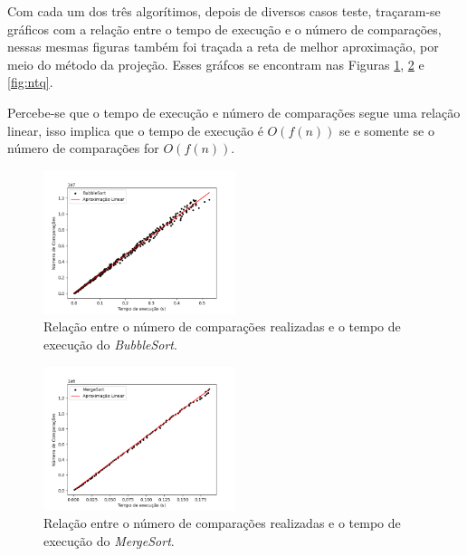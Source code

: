 \documentclass[12pt,a4paper,oneside]{article}
\begin{document}
\quad Com cada um dos três algorítimos, depois de diversos casos teste, traçaram-se gráficos com a relação entre o tempo de execução e o número de comparações, nessas mesmas figuras também foi traçada a reta de melhor aproximação, por meio do método da projeção. Esses gráfcos se encontram nas Figuras \ref{fig:ntb}, \ref{fig:ntm} e \ref{fig:ntq}.

\quad Percebe-se que o tempo de execução e número de comparações segue uma relação linear, isso implica que o tempo de execução é $O(f(n))$ se e somente se o número de comparações for $O(f(n))$. 

\begin{figure}[H]
\begin{center}
    \includegraphics[width=0.5\textwidth]{FigTNB.png} 
\end{center}
\caption{Relação entre o número de comparações realizadas e o tempo de execução do \textit{BubbleSort}.}
\label{fig:ntb}
\end{figure}

\begin{figure}[H]
\begin{center}
    \includegraphics[width=0.5\textwidth]{FigTNM.png} 
\end{center}
\caption{Relação entre o número de comparações realizadas e o tempo de execução do \textit{MergeSort}.}
\label{fig:ntm}
\end{figure}
\end{document}
